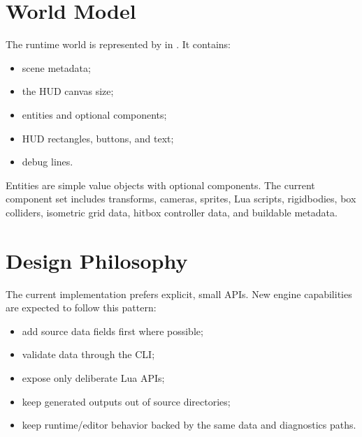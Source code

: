 \section{World Model}

The runtime world is represented by  in
. It contains:

\begin{itemize}
  \item scene metadata;
  \item the HUD canvas size;
  \item entities and optional components;
  \item HUD rectangles, buttons, and text;
  \item debug lines.
\end{itemize}

Entities are simple value objects with optional components. The current component set includes transforms, cameras, sprites, Lua scripts, rigidbodies, box colliders, isometric grid data, hitbox controller data, and buildable metadata.

\section{Design Philosophy}

The current implementation prefers explicit, small APIs. New engine capabilities are expected to follow this pattern:

\begin{itemize}
  \item add source data fields first where possible;
  \item validate data through the CLI;
  \item expose only deliberate Lua APIs;
  \item keep generated outputs out of source directories;
  \item keep runtime/editor behavior backed by the same data and diagnostics paths.
\end{itemize}
